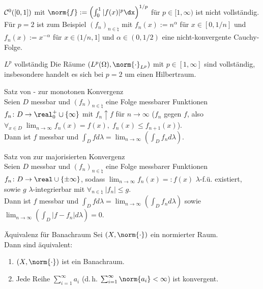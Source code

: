 \linie
\pagebreak

\begin{Bem}
    $\mathcal{C}^0([0, 1])$ mit $\norm{f} := \left(\int_0^1 |f(x)|^p \dx\right)^{1/p}$ für $p \in [1, \infty)$
    ist nicht vollständig.\\
    Für $p = 2$ ist zum Beispiel $(f_n)_{n \in \natural}$ mit $f_n(x) := n^\alpha$ für
    $x \in [0, 1/n]$ und $f_n(x) := x^{-\alpha}$ für $x \in (1/n, 1]$ und $\alpha \in (0, 1/2)$
    eine nicht-konvergente Cauchy-Folge.
\end{Bem}

\begin{Satz}{$L^p$ vollständig}
    Die Räume $(L^p(\Omega), \norm{\cdot}_{L^p})$ mit $p \in [1, \infty]$
    sind vollständig, insbesondere handelt es sich bei $p = 2$ um einen Hilbertraum.
\end{Satz}

\begin{Satz}{Satz von - zur monotonen Konvergenz}\\
    Seien $D$ messbar und $(f_n)_{n \in \natural}$ eine Folge messbarer Funktionen
    $f_n\colon D \rightarrow \real_0^+ \cup \{\infty\}$ mit $f_n \uparrow f$ für $n \to \infty$
    ($f_n$  gegen $f$, also
    $\forall_{x \in D}\; \lim_{n \to \infty} f_n(x) = f(x),\; f_n(x) \le f_{n+1}(x)$).\\
    Dann ist $f$ messbar und
    $\int_D f d\lambda = \lim_{n \to \infty} \left(\int_D f_n d\lambda\right)$.
\end{Satz}

\begin{Satz}{Satz von  zur majorisierten Konvergenz}\\
    Seien $D$ messbar und $(f_n)_{n \in \natural}$ eine Folge messbarer Funktionen
    $f_n\colon D \rightarrow \real \cup \{\pm\infty\}$, sodass
    $\lim_{n \to \infty} f_n(x) =: f(x)$ $\lambda$-f.ü. existiert, sowie
    $g$ $\lambda$-integrierbar mit $\forall_{n \in \natural}\; |f_n| \le g$.\\
    Dann ist $f$ messbar und
    $\int_D f d\lambda = \lim_{n \to \infty} \left(\int_D f_n d\lambda\right)$ sowie
    $\lim_{n \to \infty} \left(\int_D |f - f_n| d\lambda\right) = 0$.
\end{Satz}

\begin{Lemma}{Äquivalenz für Banachraum}
    Sei $(X, \norm{\cdot})$ ein normierter Raum.\\
    Dann sind äquivalent:
    \begin{enumerate}
        \item
        $(X, \norm{\cdot})$ ist ein Banachraum.

        \item
        Jede  Reihe $\sum_{i=1}^\infty a_i$
        (d.\,h. $\sum_{i=1}^\infty \norm{a_i} < \infty$) ist konvergent.
    \end{enumerate}
\end{Lemma}

